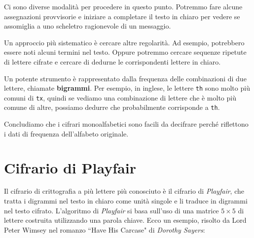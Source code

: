 Ci sono diverse modalità per procedere in questo punto. Potremmo fare alcune assegnazioni
provvisorie e iniziare a completare il testo in chiaro per vedere se assomiglia a uno scheletro
ragionevole di un messaggio.

Un approccio più sistematico è cercare altre regolarità. Ad esempio,
potrebbero essere noti alcuni termini nel testo. Oppure potremmo cercare sequenze ripetute di lettere
cifrate e cercare di dedurne le corrispondenti lettere in chiaro.

Un potente strumento è rappresentato dalla frequenza delle combinazioni di due lettere, 
chiamate \textbf{bigrammi}. Per esempio, in inglese, le lettere \verb|th| sono molto più
comuni di \verb|tx|, quindi se vediamo una combinazione di lettere che è molto più comune
di altre, possiamo dedurre che probabilmente corrisponde a \verb|th|.

Concludiamo che i cifrari monoalfabetici sono facili da decifrare perché riflettono i dati di frequenza
dell'alfabeto originale.
\section{Cifrario di Playfair}
Il cifrario di crittografia a più lettere più conosciuto è il cifrario di
\textit{Playfair}, che tratta i digrammi nel testo in chiaro come unità singole e li traduce
in digrammi nel testo cifrato. L'algoritmo di \textit{Playfair} si basa sull'uso di una matrice
$5 \times 5$ di lettere costruita utilizzando una parola chiave. Ecco un esempio, risolto da Lord Peter Wimsey nel
romanzo ``Have His Carcase" di \textit{Dorothy Sayers}:

